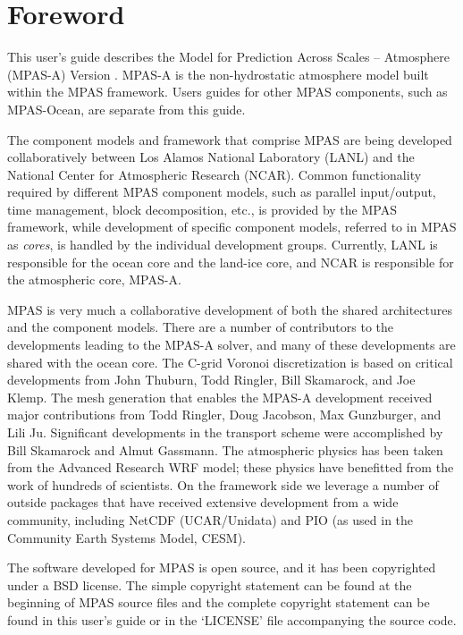 \chapter*{Foreword}
\label{chap:foreword}

This user's guide describes the Model for Prediction Across Scales -- Atmosphere
(MPAS-A) Version \version.   MPAS-A is the non-hydrostatic atmosphere model built within the MPAS
framework. Users guides for other MPAS components, such as MPAS-Ocean, are separate from this guide.

The component models and framework that comprise MPAS are being developed collaboratively between Los Alamos National
Laboratory (LANL) and the National Center for Atmospheric Research (NCAR).
Common functionality required by different MPAS component models, such as parallel
input/output, time management, block decomposition, etc., is provided by the
MPAS framework, while development of specific component models, referred to in MPAS as {\em cores}, is handled by the
individual development groups.  Currently, LANL is responsible for the ocean core and the land-ice core, and NCAR is responsible for the atmospheric core, MPAS-A.

MPAS is very much a collaborative development of both the shared architectures and the component models.  There are a number of contributors to the developments leading to the MPAS-A solver, and many of these developments are shared with the ocean core.  The C-grid Voronoi discretization is based on critical developments from John Thuburn, Todd Ringler, Bill Skamarock, and Joe Klemp.  The mesh generation that enables the MPAS-A development received major contributions from Todd Ringler, Doug Jacobson, Max Gunzburger, and Lili Ju.  Significant developments in the transport scheme were accomplished by Bill Skamarock and Almut Gassmann.  The atmospheric physics has been taken from the Advanced Research WRF model; these physics have benefitted from the work of hundreds of scientists.  On the framework side we leverage a number of outside packages that have received extensive development from a wide community, including NetCDF (UCAR/Unidata) and PIO (as used in the Community Earth Systems Model, CESM).

The software developed for MPAS is open source, and it has been copyrighted under a BSD license.  The simple copyright statement can be found at the beginning of MPAS source files and the complete copyright statement can be found in this user's guide or in the `LICENSE' file accompanying the source code.

